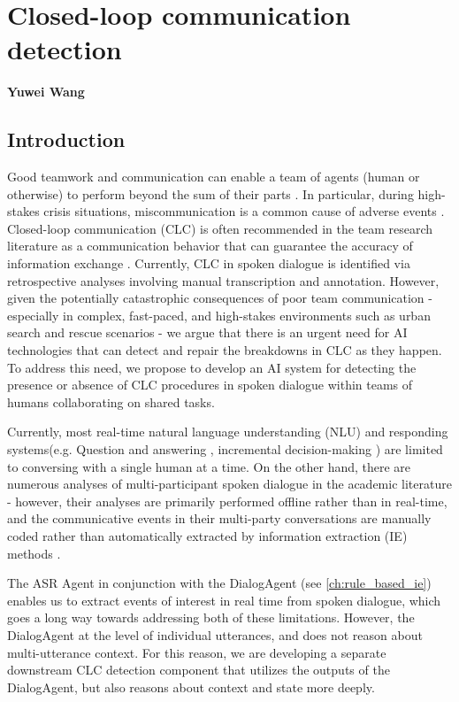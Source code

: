 \chapter{Closed-loop communication detection}
\label{ch:clc}
\textbf{Yuwei Wang}

\section{Introduction}

Good teamwork and communication can enable a team of agents (human or otherwise)
to perform beyond the sum of their parts \citep{roberts2022state}. In particular, 
during high-stakes crisis situations, miscommunication is a common cause of
adverse events \citep{taylor2014description,davis2017operative}. Closed-loop
communication (CLC) is often recommended in the team research literature
as a communication behavior that can guarantee the accuracy of information
exchange \citep{marzuki2019closed}. Currently, CLC in spoken dialogue is
identified via retrospective analyses involving manual transcription and
annotation. However, given the potentially catastrophic consequences of poor
team communication \citep{flin2004identifying} - especially in complex,
fast-paced, and high-stakes environments such as urban search and rescue
scenarios - we argue that there is an urgent need for AI technologies that can
detect and repair the breakdowns in CLC as they happen. To address this need,
we propose to develop an AI system for detecting the presence or absence of CLC
procedures in spoken dialogue within teams of humans collaborating on shared
tasks.

Currently, most real-time natural language understanding (NLU) and responding systems(e.g. Question and
answering \citep{hawkins_goodman_2017}, incremental
decision-making \citep{devault2011detecting}) are limited to conversing with a
single human at a time. On the other hand, there are numerous analyses of
multi-participant spoken dialogue in the academic literature - however, their
analyses are primarily performed offline rather than in real-time, and the communicative events in their multi-party conversations are manually coded rather than automatically extracted by information extraction (IE) methods \citep{jagannath2022speech}.

The ASR Agent in conjunction with the DialogAgent (see \autoref{ch:rule_based_ie})
enables us to extract events of interest in real time from spoken dialogue,
which goes a long way towards addressing both of these limitations. However,
the DialogAgent at the level of individual utterances, and does not reason
about multi-utterance context. For this reason, we are developing a separate downstream
CLC detection component that utilizes the outputs of the DialogAgent, but also
reasons about context and state more deeply.


